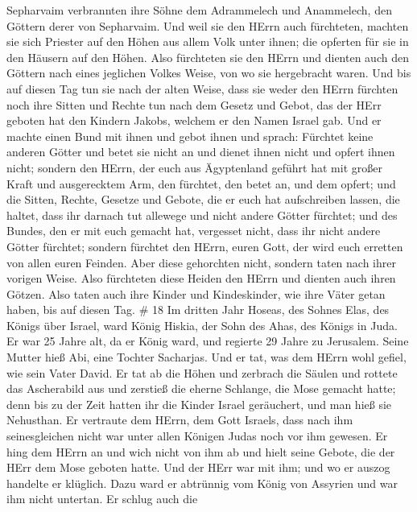 Sepharvaim verbrannten ihre Söhne dem Adrammelech und Anammelech, den
Göttern derer von Sepharvaim.  Und weil sie den HErrn auch
fürchteten, machten sie sich Priester auf den Höhen aus allem Volk unter
ihnen; die opferten für sie in den Häusern auf den Höhen. 
Also fürchteten sie den HErrn und dienten auch den Göttern nach eines
jeglichen Volkes Weise, von wo sie hergebracht waren.  Und
bis auf diesen Tag tun sie nach der alten Weise, dass sie weder den
HErrn fürchten noch ihre Sitten und Rechte tun nach dem Gesetz und
Gebot, das der HErr geboten hat den Kindern Jakobs, welchem er den Namen
Israel gab.  Und er machte einen Bund mit ihnen und gebot
ihnen und sprach: Fürchtet keine anderen Götter und betet sie nicht an
und dienet ihnen nicht und opfert ihnen nicht;  sondern den
HErrn, der euch aus Ägyptenland geführt hat mit großer Kraft und
ausgerecktem Arm, den fürchtet, den betet an, und dem opfert;
 und die Sitten, Rechte, Gesetze und Gebote, die er euch
hat aufschreiben lassen, die haltet, dass ihr darnach tut allewege und
nicht andere Götter fürchtet;  und des Bundes, den er mit
euch gemacht hat, vergesset nicht, dass ihr nicht andere Götter
fürchtet;  sondern fürchtet den HErrn, euren Gott, der wird
euch erretten von allen euren Feinden.  Aber diese
gehorchten nicht, sondern taten nach ihrer vorigen Weise. 
Also fürchteten diese Heiden den HErrn und dienten auch ihren Götzen.
Also taten auch ihre Kinder und Kindeskinder, wie ihre Väter getan
haben, bis auf diesen Tag. \# 18  Im dritten Jahr Hoseas,
des Sohnes Elas, des Königs über Israel, ward König Hiskia, der Sohn des
Ahas, des Königs in Juda.  Er war 25 Jahre alt, da er König
ward, und regierte 29 Jahre zu Jerusalem. Seine Mutter hieß Abi, eine
Tochter Sacharjas.  Und er tat, was dem HErrn wohl gefiel,
wie sein Vater David.  Er tat ab die Höhen und zerbrach die
Säulen und rottete das Ascherabild aus und zerstieß die eherne Schlange,
die Mose gemacht hatte; denn bis zu der Zeit hatten ihr die Kinder
Israel geräuchert, und man hieß sie Nehusthan.  Er vertraute
dem HErrn, dem Gott Israels, dass nach ihm seinesgleichen nicht war
unter allen Königen Judas noch vor ihm gewesen.  Er hing dem
HErrn an und wich nicht von ihm ab und hielt seine Gebote, die der HErr
dem Mose geboten hatte.  Und der HErr war mit ihm; und wo er
auszog handelte er klüglich. Dazu ward er abtrünnig vom König von
Assyrien und war ihm nicht untertan.  Er schlug auch die
